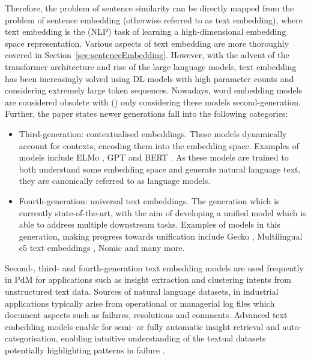 \documentclass[10pt,oneside]{report}
\begin{document}
Therefore, the problem of sentence similarity can be directly mapped from the problem of sentence embedding (otherwise referred to as text embedding), where text embedding is the (NLP) task of learning a high-dimensional embedding space representation. Various aspects of text embedding are more thoroughly covered in Section~\ref{sec:sentenceEmbedding}. However, with the advent of the transformer architecture \cite{vaswani2017attention} and rise of the large language models, text embedding has been increasingly solved using DL models with high parameter counts \cite{cao2024recent} and considering extremely large token sequences. Nowadays, word embedding models are considered obsolete with (\citet{cao2024recent}) only considering these models second-generation. Further, the paper states newer generations fall into the following categories:
\begin{itemize}
    \item Third-generation: contextualised embeddings. These models dynamically account for contexts, encoding them into the embedding space. Examples of models include ELMo \cite{sarzynska2021detecting}, GPT \cite{radford2018improving} and BERT \cite{devlin2019bert}. As these models are trained to both understand some embedding space and generate natural language text, they are canonically referred to as language models.
    \item Fourth-generation: universal text embeddings. The generation which is currently state-of-the-art, with the aim of developing a unified model which is able to address multiple downstream tasks. Examples of models in this generation, making progress towards unification include Gecko \cite{lee2024gecko}, Multilingual e5 text embeddings \cite{wang2024multilingual}, Nomic \cite{nussbaum2024nomic} and many more. 
\end{itemize}

Second-, third- and fourth-generation text embedding models are used frequently in PdM for applications such as insight extraction \cite{abijith2023large,usuga2022using} and clustering intents from unstructured text data. Sources of natural language datasets, in industrial applications typically arise from operational or managerial log files which document aspects such as failures, resolutions and comments. Advanced text embedding models enable for semi- or fully automatic insight retrieval and auto-categorisation, enabling intuitive understanding of the textual datasets potentially highlighting patterns in failure \cite{nota2022text}.
\end{document}
